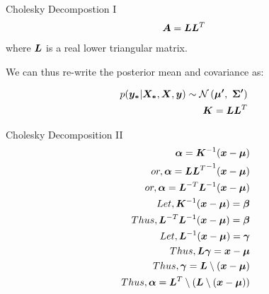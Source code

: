 \documentclass{beamer}
\begin{document}
\begin{frame}{Cholesky Decompostion I}
\begin{align*}
\bm{A} = \bm{L}\bm{L}^T
\end{align*}
where $\bm{L}$ is a real lower triangular matrix.


We can thus re-write the posterior mean and covariance as:

\begin{align*}
p(\bm{y_*}|\bm{X_*}, \bm{X}, \bm{y}) \sim \mathcal{N}\left(\bm{\mu'}, \ \bm{\Sigma'}\right) \\
\bm{K} = \bm{LL}^T \\
\end{align*}
\end{frame}

\begin{frame}{Cholesky Decomposition II}
\begin{align*}
\bm{\alpha} = \bm{K}^{-1}(\bm{x}-\bm{\mu}) \\
or, \bm{\alpha} = {\bm{LL}^T}^{-1}(\bm{x}-\bm{\mu}) \\
or, \bm{\alpha} = \bm{L}^{-T}\bm{L}^{-1}(\bm{x}-\bm{\mu}) \\
Let, \bm{K}^{-1}(\bm{x}-\bm{\mu}) = \bm{\beta} \\
Thus, \bm{L}^{-T}\bm{L}^{-1}(\bm{x}-\bm{\mu}) = \bm{\beta} \\
Let, \bm{L}^{-1}(\bm{x}-\bm{\mu}) = \bm{\gamma}\\
Thus, \bm{L}\bm{\gamma} = \bm{x}-\bm{\mu} \\
Thus, \bm{\gamma} = \bm{L} \setminus (\bm{x}-\bm{\mu})\\\
Thus, \bm{\alpha} = \bm{L}^{T} \setminus (\bm{L} \setminus (\bm{x}-\bm{\mu}))
\end{align*}

\end{frame}
\end{document}
